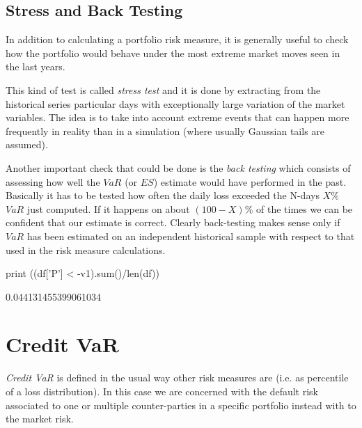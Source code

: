 \subsection{Stress and Back Testing}
\label{stress-testing-and-back-testing}

In addition to calculating a portfolio risk measure, it is generally useful to check how the portfolio would behave under the most extreme market moves seen in the last years.

This kind of test is called \emph{stress test} and it is done by extracting from the historical series particular days with exceptionally large variation of the market variables.
The idea is to take into account extreme events that can happen more frequently in reality than in a simulation (where usually Gaussian tails are assumed). 

Another important check that could be done is the \emph{back testing} which consists of assessing how well the $VaR$ (or $ES$) estimate would have performed in the past. Basically it has to be tested how often the daily loss exceeded the N-days $X\%$ $VaR$ just computed. If it happens on about $(100-X)\%$ of the times we can be confident that our estimate is correct. Clearly back-testing makes sense only if $VaR$ has been estimated on an independent historical sample with respect to that used in the risk measure calculations.

\begin{ipython}
print ((df['P'] < -v1).sum()/len(df))
\end{ipython}
\begin{ioutput}
0.044131455399061034
\end{ioutput}

\section{Credit VaR}
\label{credit-var-cr-var}


\emph{Credit VaR} is defined in the usual way other risk measures are (i.e. as percentile of a loss distribution). In this case we are concerned with the default risk associated to one or multiple counter-parties in a specific portfolio instead with to the market risk.

